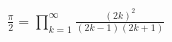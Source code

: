 \documentclass[preview]{standalone}
\begin{document}
\begin{align*}
\frac{\pi}{2} = \prod_{k=1}^{\infty} \frac{(2k)^2}{(2k-1)(2k+1)}
\end{align*}
\end{document}

